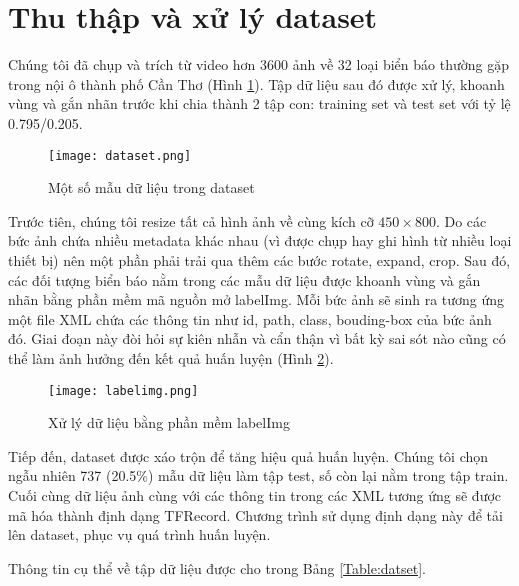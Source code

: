 \documentclass[../thesis.tex]{subfiles}
\begin{document}
\section{Thu thập và xử lý dataset}

Chúng tôi đã chụp và trích từ video hơn 3600 ảnh về 32 loại biển báo thường gặp trong nội ô thành phố Cần Thơ (Hình \ref{Fig:dataset_records}). Tập dữ liệu sau đó được xử lý, khoanh vùng và gắn nhãn trước khi chia thành 2 tập con: training set và test set với tỷ lệ 0.795/0.205.

\begin{figure}[H]
	\centering
	\texttt{[image: dataset.png]}
	\caption{Một số mẫu dữ liệu trong dataset}\label{Fig:dataset_records}
\end{figure}

Trước tiên, chúng tôi resize tất cả hình ảnh về cùng kích cỡ $450 \times 800$. Do các bức ảnh chứa nhiều metadata khác nhau (vì được chụp hay ghi hình từ nhiều loại thiết bị) nên một phần phải trải qua thêm các bước rotate, expand, crop. Sau đó, các đối tượng biển báo nằm trong các mẫu dữ liệu được khoanh vùng và gắn nhãn bằng phần mềm mã nguồn mở labelImg\cite{labelimg}. Mỗi bức ảnh sẽ sinh ra tương ứng một file XML chứa các thông tin như id, path, class, bouding-box của bức ảnh đó. Giai đoạn này đòi hỏi sự kiên nhẫn và cẩn thận vì bất kỳ sai sót nào cũng có thể làm ảnh hưởng đến kết quả huấn luyện (Hình \ref{Fig:labelimg}).

\begin{figure}[H]
	\centering
	\texttt{[image: labelimg.png]}
	\caption{Xử lý dữ liệu bằng phần mềm labelImg}\label{Fig:labelimg}
\end{figure}

Tiếp đến, dataset được xáo trộn để tăng hiệu quả huấn luyện. Chúng tôi chọn ngẫu nhiên 737 (20.5\%) mẫu dữ liệu làm tập test, số còn lại nằm trong tập train. Cuối cùng dữ liệu ảnh cùng với các thông tin trong các XML tương ứng sẽ được mã hóa thành định dạng TFRecord. Chương trình sử dụng định dạng này để tải lên dataset, phục vụ quá trình huấn luyện.

Thông tin cụ thể về tập dữ liệu được cho trong Bảng \ref{Table:datset}.
\end{document}
